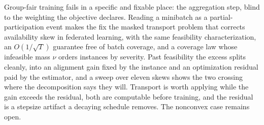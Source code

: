 \documentclass{article}
\theoremstyle{definition}
\begin{document}
Group-fair training fails in a specific and fixable place: the aggregation step,
blind to the weighting the objective declares. Reading a minibatch as a
partial-participation event makes the fix the masked transport problem that
corrects availability skew in federated learning, with the same feasibility
characterization, an $O(1/\sqrt{T})$ guarantee free of batch coverage, and a
coverage law whose infeasible mass $\nu$ orders instances by severity. Past
feasibility the excess splits cleanly, into an alignment gain fixed by the
instance and an optimization residual paid by the estimator, and a sweep over
eleven skews shows the two crossing where the decomposition says they will. Transport is
worth applying while the gain exceeds the residual, both are computable before
training, and the residual is a stepsize artifact a decaying schedule removes.
The nonconvex case remains open.

\clearpage
\renewcommand{\refname}{REFERENCES}
\end{document}
